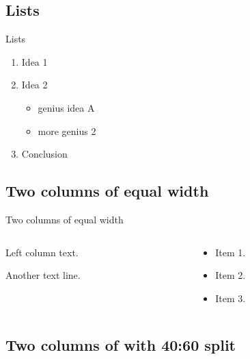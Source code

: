 \documentclass[
  11pt,
  aspectratio=169]{beamer}
\providecommand{\tightlist}{%
  \setlength{\itemsep}{0pt}\setlength{\parskip}{0pt}}
\begin{document}
\subsection{Lists}\label{lists}

\begin{frame}{Lists}
\begin{enumerate}
\tightlist
\item
  Idea 1
\item
  Idea 2

  \begin{itemize}
  \tightlist
  \item
    genius idea A
  \item
    more genius 2
  \end{itemize}
\item
  Conclusion
\end{enumerate}
\end{frame}

\subsection{Two columns of equal
width}\label{two-columns-of-equal-width}

\begin{frame}{Two columns of equal width}
\begin{columns}[T]
\begin{column}{0.48\linewidth}
Left column text.

Another text line.
\end{column}

\begin{column}{0.48\linewidth}
\begin{itemize}
\tightlist
\item
  Item 1.
\item
  Item 2.
\item
  Item 3.
\end{itemize}
\end{column}
\end{columns}
\end{frame}

\subsection{Two columns of with 40:60
split}\label{two-columns-of-with-4060-split}
\end{document}
